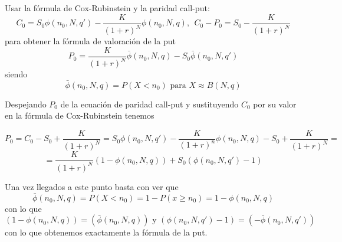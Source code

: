 \begin{problem}[6]
Usar la fórmula de Cox-Rubinstein y la paridad call-put:
\[C_0=S_0 \phi(n_0,N,q')-\frac{K}{(1+r)^N}\phi(n_0,N,q), \ \ C_0-P_0=S_0-\frac{K}{(1+r)^N}\]
para obtener la fórmula de valoración de la put
\[P_0=\frac{K}{(1+r)^N}\bar{\phi}(n_0,N,q)-S_0\bar{\phi}(n_0,N,q')\]
siendo
\[\bar{\phi}(n_0,N,q)=P(X<n_0) \text{ para } X \approx B(N,q)\]
\solution
{}

Despejando $P_0$ de la ecuación de paridad call-put y sustituyendo $C_0$ por su valor en la fórmula de Cox-Rubinstein tenemos

\[P_0 = C_0-S_0+\frac{K}{(1+r)^N} = S_0 \phi(n_0,N,q')-\frac{K}{(1+r)^n}\phi(n_0,N,q)- S_0 + \frac{K}{(1+r)^N} =\]
\[ = \frac{K}{(1+r)^N}\left(1-\phi(n_0,N,q) \right) + S_0\left(\phi(n_0,N,q') -1\right)\]

Una vez llegados a este punto basta con ver que
\[\bar{\phi}(n_0,N,q) = P(X<n_0) = 1- P(x \geq n_0) = 1-\phi(n_0,N,q)\]
con lo que
\[\left(1-\phi(n_0,N,q) \right) = \left(\bar{\phi}(n_0,N,q) \right) \text{ y } \left(\phi(n_0,N,q') -1\right) = \left(-\bar{\phi}(n_0,N,q') \right)\]
con lo que obtenemos exactamente la fórmula de la put.
\end{problem}
